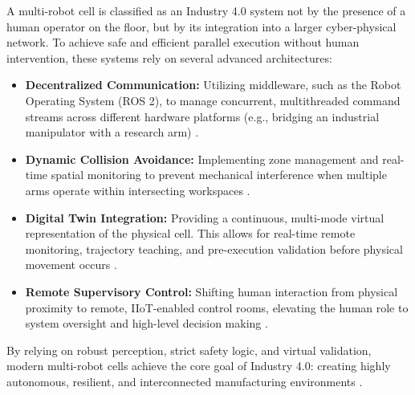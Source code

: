 A multi-robot cell is classified as an Industry 4.0 system not by the presence of a human operator on the floor, but by its integration into a larger cyber-physical network. To achieve safe and efficient parallel execution without human intervention, these systems rely on several advanced architectures:

\begin{itemize}
    \item \textbf{Decentralized Communication:} Utilizing middleware, such as the Robot Operating System (ROS 2), to manage concurrent, multithreaded command streams across different hardware platforms (e.g., bridging an industrial manipulator with a research arm) \cite{macenski2022robot}.
    \item \textbf{Dynamic Collision Avoidance:} Implementing zone management and real-time spatial monitoring to prevent mechanical interference when multiple arms operate within intersecting workspaces \cite{khatib1986real,michalos2015design}.
    \item \textbf{Digital Twin Integration:} Providing a continuous, multi-mode virtual representation of the physical cell. This allows for real-time remote monitoring, trajectory teaching, and pre-execution validation before physical movement occurs \cite{glaessgen2012digital,wang2020digital,kritzinger2018digital}.
    \item \textbf{Remote Supervisory Control:} Shifting human interaction from physical proximity to remote, IIoT-enabled control rooms, elevating the human role to system oversight and high-level decision making \cite{wang2017collaborative}.
\end{itemize}

By relying on robust perception, strict safety logic, and virtual validation, modern multi-robot cells achieve the core goal of Industry 4.0: creating highly autonomous, resilient, and interconnected manufacturing environments \cite{lasi2014industry,wang2017collaborative}.
